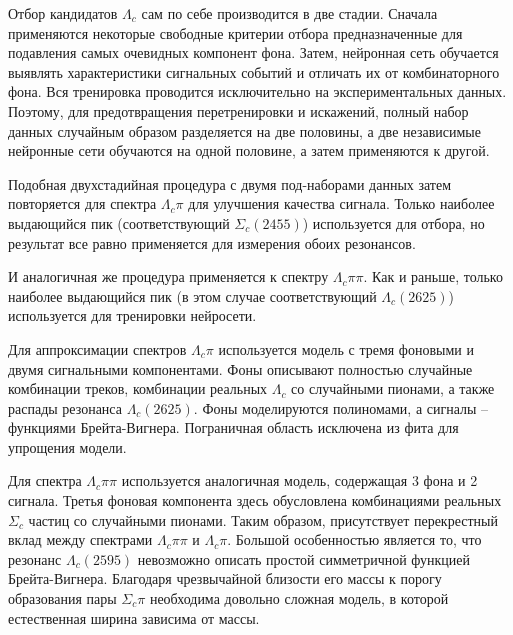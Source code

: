 \documentclass[a4paper, 12pt]{article}
\begin{document}

Отбор кандидатов $\Lambda_c$ сам по себе производится в две стадии. 
Сначала применяются некоторые свободные критерии отбора предназначенные 
для подавления самых очевидных компонент фона. Затем, нейронная сеть 
обучается выявлять характеристики сигнальных событий и отличать их от 
комбинаторного фона. Вся тренировка проводится исключительно на 
экспериментальных данных. Поэтому, для предотвращения перетренировки 
и искажений, полный набор данных случайным образом разделяется на две 
половины, а две независимые нейронные сети обучаются на одной половине, 
а затем применяются к другой.
%

Подобная двухстадийная процедура с двумя под-наборами данных затем 
повторяется для спектра $\Lambda_c\pi$ для улучшения качества сигнала. 
Только наиболее выдающийся пик (соответствующий $\Sigma_c(2455)$) 
используется для отбора, но результат все равно применяется для 
измерения обоих резонансов.


И аналогичная же процедура применяется к спектру $\Lambda_c\pi\pi$. Как 
и раньше, только наиболее выдающийся пик (в этом случае соответствующий 
$\Lambda_c(2625)$) используется для тренировки нейросети.


Для аппроксимации спектров $\Lambda_c\pi$ используется модель с тремя 
фоновыми и двумя сигнальными компонентами. Фоны описывают полностью 
случайные комбинации треков, комбинации реальных $\Lambda_c$ со 
случайными пионами, а также распады резонанса $\Lambda_c(2625)$. Фоны 
моделируются полиномами, а сигналы -- функциями Брейта-Вигнера. 
Пограничная область исключена из фита для упрощения модели.


Для спектра $\Lambda_c\pi\pi$ используется аналогичная модель, 
содержащая 3 фона и 2 сигнала. Третья фоновая компонента здесь 
обусловлена комбинациями реальных $\Sigma_c$ частиц со случайными 
пионами. Таким образом, присутствует перекрестный вклад между спектрами 
$\Lambda_c\pi\pi$ и $\Lambda_c\pi$. Большой особенностью является то, 
что резонанс $\Lambda_c(2595)$ невозможно описать простой симметричной 
функцией Брейта-Вигнера. Благодаря чрезвычайной близости его массы 
к порогу образования пары $\Sigma_c\pi$ необходима довольно сложная 
модель, в которой естественная ширина зависима от массы.
\end{document}
